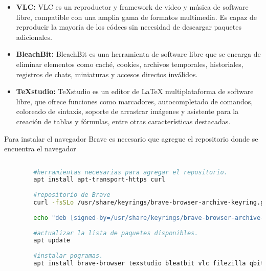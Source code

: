 \begin{itemize}
			\item\textbf{VLC:} VLC es un reproductor y framework de video y música de software libre, compatible con una amplia gama de formatos multimedia. Es capaz de reproducir la mayoría de los códecs sin necesidad de descargar paquetes adicionales.
			
			\item\textbf{BleachBit:} BleachBit es una herramienta de software libre que se encarga de eliminar elementos como caché, cookies, archivos temporales, historiales, registros de chats, miniaturas y accesos directos inválidos.
			
			\item\textbf{TeXstudio:} TeXstudio es un editor de \LaTeX{} multiplataforma de software libre, que ofrece funciones como marcadores, autocompletado de comandos, coloreado de sintaxis, soporte de arrastrar imágenes y asistente para la creación de tablas y fórmulas, entre otras características destacadas.
			
		
		\end{itemize}
		
		Para instalar el navegador Brave es necesario que agregue el repositorio donde se encuentra el navegador
		
		\vspace{0.3cm}
			
		\begin{lstlisting}[language=Bash, caption=Instalación de programas]	
	
		#herramientas necesarias para agregar el repositorio.
		apt install apt-transport-https curl
		
		#repositorio de Brave
		curl -fsSLo /usr/share/keyrings/brave-browser-archive-keyring.gpg https://brave-browser-apt-release.s3.brave.com/brave-browser-archive-keyring.gpg
	
		echo "deb [signed-by=/usr/share/keyrings/brave-browser-archive-keyring.gpg arch=amd64] 		https://brave-browser-apt-release.s3.brave.com/ stable main"| tee /etc/apt/sources.list.d/brave-browser-release.list
		
		#actualizar la lista de paquetes disponibles.
		apt update
		
		#instalar pogramas.
		apt install brave-browser texstudio bleatbit vlc filezilla qbittorrent handbrake inkscape gimp evince thunderbird chromium
		
			
		\end{lstlisting}
